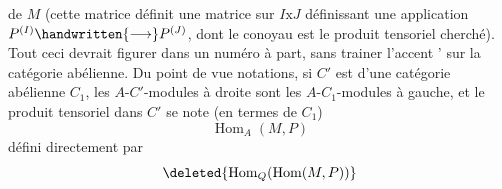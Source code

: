  de $M$ (cette matrice définit une matrice sur $I\mathbin{\mathrm{x}}J$\handwritten{,} définissant une
application $P^{(I)}\handwritten{\longrightarrow}P^{(J)}$, dont le conoyau est le produit tensoriel cherché).
Tout ceci devrait figurer dans un numéro à part, sans trainer l'accent '
sur la catégorie abélienne. Du point de vue notations, si $C'$ est 
d'une catégorie abélienne $C_1$,  les $A$-$C'$-modules à droite
sont les $A$-$C_1$-modules à gauche, et le produit tensoriel dans $C'$ se note
(en termes de $C_1$)
\[
\operatorname{Hom}_A(M,P)
\]
défini directement par
\[
\deleted{\operatorname{Hom}_{Q}(\operatorname{Hom}(M,P))}
\]

